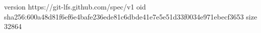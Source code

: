 version https://git-lfs.github.com/spec/v1
oid sha256:600a48d81f6ef6e4bafe236ede81c6dbde41e7e5e51d33f0034e971ebecf3653
size 32864
